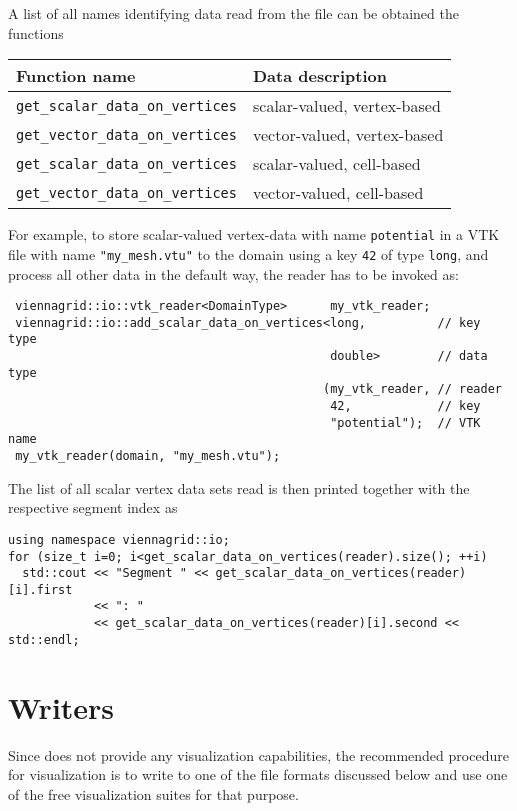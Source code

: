 A list of all names identifying data read from the file can be obtained the functions
 \begin{center}
  \begin{tabular}{|l|l|}
   \hline
   Function name & Data description \\
   \hline
   \lstinline|get_scalar_data_on_vertices| & scalar-valued, vertex-based \\
   \lstinline|get_vector_data_on_vertices| & vector-valued, vertex-based \\
   \hline
   \lstinline|get_scalar_data_on_vertices| & scalar-valued, cell-based \\
   \lstinline|get_vector_data_on_vertices| & vector-valued, cell-based \\
   \hline
  \end{tabular}
 \end{center}
  For example, to store scalar-valued vertex-data with name \texttt{potential} in a VTK file with name \lstinline|"my_mesh.vtu"| to the domain using a key \lstinline|42| of type \lstinline|long|, and process all other data in the default way, the reader has to be invoked as:
 \begin{lstlisting}
 viennagrid::io::vtk_reader<DomainType>      my_vtk_reader;
 viennagrid::io::add_scalar_data_on_vertices<long,          // key type
                                             double>        // data type
                                            (my_vtk_reader, // reader
                                             42,            // key
                                             "potential");  // VTK name
 my_vtk_reader(domain, "my_mesh.vtu");
 \end{lstlisting}
 The list of all scalar vertex data sets read is then printed together with the respective segment index as
 \begin{lstlisting}
using namespace viennagrid::io;
for (size_t i=0; i<get_scalar_data_on_vertices(reader).size(); ++i)
  std::cout << "Segment " << get_scalar_data_on_vertices(reader)[i].first 
            << ": "
            << get_scalar_data_on_vertices(reader)[i].second << std::endl;
 \end{lstlisting}
 

\section{Writers}
Since {\ViennaGrid} does not provide any visualization capabilities, the recommended procedure for visualization is 
to write to one of the file formats discussed below and use one of the free visualization suites for that purpose.

